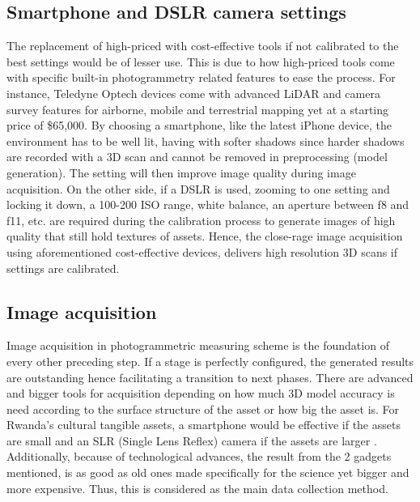 \documentclass[a4paper, 12pt]{article}
\begin{document}
\subsection{Smartphone and DSLR camera settings}
The replacement of high-priced with cost-effective tools if not calibrated to the best settings would be of lesser use. This is due to how high-priced tools come with specific built-in photogrammetry related features to ease the process. For instance, \cite{Geo3D2019} Teledyne Optech devices come with advanced LiDAR and camera survey features for airborne, mobile and terrestrial mapping yet at a starting price of \$65,000. By choosing a smartphone, like the latest iPhone device, the environment has to be well lit, having with softer shadows since harder shadows are recorded with a 3D scan and cannot be removed in preprocessing (model generation). The setting will then improve image quality during image acquisition. On the other side, if a DSLR is used, \cite{calib} zooming to one setting and locking it down, a 100-200 ISO range, white balance, an aperture between f8 and f11, etc. are required during the calibration process to generate images of high quality that still hold textures of assets. Hence, the close-rage image acquisition using aforementioned cost-effective devices, delivers high resolution 3D scans if settings are calibrated.

\subsection{Image acquisition}
Image acquisition in photogrammetric measuring scheme is the foundation of every other preceding step. If a stage is perfectly configured, the generated results are outstanding hence facilitating a transition to next phases. There are advanced and bigger tools for acquisition depending on how much 3D model accuracy is need according to the surface structure of the asset or how big the asset is\cite{Na2022}. For Rwanda's cultural tangible assets, a smartphone would be effective if the assets are small \cite{An2022} and an SLR (Single Lens Reflex) camera if the assets are larger \cite{cam1}. Additionally, because of technological advances, the result from the 2 gadgets mentioned, is as good as old ones made specifically for the science yet bigger and more expensive. Thus, this is considered as the main data collection method.
\end{document}
